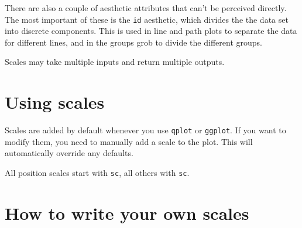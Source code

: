 There are also a couple of aesthetic attributes that can't be perceived directly.  The most important of these is the {\tt id} aesthetic, which divides the the data set into discrete components.   This is used in line and path plots to separate the data for different lines, and in the groups grob to divide the different groups. 

Scales may take multiple inputs and return multiple outputs.

\section{Using scales}\label{sec:using_scales}

Scales are added by default whenever you use {\tt qplot} or {\tt ggplot}.  If you want to modify them, you need to manually add a scale to the plot.  This will automatically override any defaults.


All position scales start with {\tt sc}, all others with {\tt sc}.

\section{How to write your own scales}\label{sec:how_to_write_your_own_scales}



